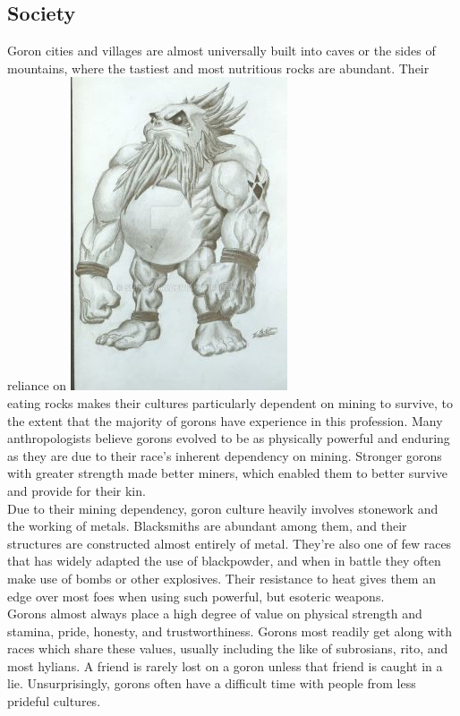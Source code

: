 \documentclass[10pt,twoside,twocolumn,openany]{book}
\begin{document}
\subsection{Society}
Goron cities and villages are almost universally built into caves or the sides of mountains, where the tastiest and most nutritious rocks are abundant. Their reliance on 
\includegraphics{darunia.jpg} \\
eating rocks makes their cultures particularly dependent on mining to survive, to the extent that the majority of gorons have experience in this profession. Many anthropologists believe gorons evolved to be as physically powerful and enduring as they are due to their race's inherent dependency on mining. Stronger gorons with greater strength made better miners, which enabled them to better survive and provide for their kin.\\
Due to their mining dependency, goron culture heavily involves stonework and the working of metals. Blacksmiths are abundant among them, and their structures are constructed almost entirely of metal. They're also one of few races that has widely adapted the use of blackpowder, and when in battle they often make use of bombs or other explosives. Their resistance to heat gives them an edge over most foes when using such powerful, but esoteric weapons.\\
Gorons almost always place a high degree of value on physical strength and stamina, pride, honesty, and trustworthiness. Gorons most readily get along with races which share these values, usually including the like of subrosians, rito, and most hylians. A friend is rarely lost on a goron unless that friend is caught in a lie. Unsurprisingly, gorons often have a difficult time with people from less prideful cultures.
\end{document}
